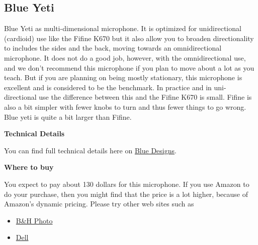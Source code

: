 \subsection{Blue Yeti}
\label{sec:blueyeti}

\begin{gram}
\label{grm:blueyeti::main}
%
Blue Yeti as multi-dimensional microphone.
%
It is optimized for unidirectional (cardioid) use like the Fifine K670
but it also allow you to broaden directionality to includes the sides
and the back, moving towards an omnidirectional microphone.
%
It does not do a good job, however, with the omnidirectional use, and we don't recommend this microphone if you plan to move about a lot as you teach.
%
But if you are planning on being mostly stationary, this microphone is excellent and is considered to be the benchmark.
%
In practice and in uni-directional use the difference between this and
the Fifine K670 is small.  Fifine is also a bit simpler with fewer knobs to turn and thus fewer things to go wrong.  Blue yeti is quite a bit larger than Fifine.


\textbf{Technical Details}

You can find full technical details here on \href{https://www.bluedesigns.com/products/yeti/}{Blue Designs}.


\textbf{Where to buy}

You expect to pay about 130 dollars for this microphone.  If you use Amazon to do your purchase, then you might find that the price is a lot higher, because of Amazon's dynamic pricing.  Please try other web sites such as 

\begin{itemize}
\item
\href{https://www.bhphotovideo.com/c/product/1252288-REG/blue_yeti_whiteout_yeti_usb_microphone_whiteout.html/?ap=y&ap=y&smp=y&smp=y&lsft=BI%3A514&gclid=CjwKCAjwgdX4BRB_EiwAg8O8HaL477lNngiVZfES7WLhUcJSUUvOZpExsDJj6nonuKow3CfyNGzRqRoC-dAQAvD_BwE}{B\&H Photo}
\item 
\href{https://www.dell.com/en-us/shop/blue-microphones-yeti-microphone-usb-aztec-copper/apd/aa829519?gacd=9614064-1012-5761040-0-0&dgc=st&gclid=CjwKCAjwgdX4BRB_EiwAg8O8HUjMAfBK6gO_-L-fdNSOjOlY2YqmqpLKR2qxP7hb-yRx8xlw1bscKBoCk0wQAvD_BwE&gclsrc=aw.ds}{Dell}
\end{itemize}
\end{gram}

\begin{gram}
\end{gram}

